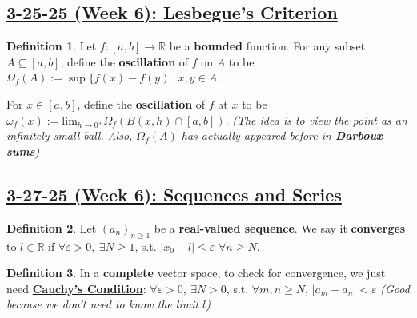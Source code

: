\documentclass[12pt,a4paper]{article}
\theoremstyle{definition}
\newtheorem{defin}{Definition}[subsection]
\newenvironment{definition}{
  \begin{defin}
}{
  \end{defin}
  \vspace{0.125em}
}
\begin{document}
\setcounter{defin}{0}
\setcounter{ex}{0}
\subsection*{\underline{\textbf{3-25-25 (Week 6): Lesbegue's Criterion}}}
\begin{definition}
  Let $f: [a, b] \to \mathbb{R}$ be a \textbf{bounded} function. For any subset $A \subseteq [a, b]$, define the \textbf{oscillation} of $f$ on $A$ to be $\boxed{\Omega_f(A) := \sup\{f(x) - f(y)\ |\ x, y \in A}$. \newline
  
  \noindent For $x \in [a, b]$, define the \textbf{oscillation} of $f$ at $x$ to be $\boxed{\omega_f(x) := \text{lim}_{h \to 0^+} \Omega_f(B(x, h) \cap [a, b])}$. \textit{(The idea is to view the point as an infinitely small ball. Also, $\Omega_f(A)$ has actually appeared before in \textbf{Darboux sums})}
\end{definition}

\setcounter{defin}{0}
\setcounter{ex}{0}
\subsection*{\underline{\textbf{3-27-25 (Week 6): Sequences and Series}}}
\begin{definition}
  Let $(a_n)_{n \geq 1}$ be a \textbf{real-valued sequence}. We say it \textbf{converges} to $l \in \mathbb{R}$ if $\forall \varepsilon > 0,\ \exists N \geq 1$, s.t. \underline{$|x_0 - l| \leq \varepsilon$} $\forall n \geq N$.
\end{definition}

\begin{definition}
  In a \textbf{complete} vector space, to check for convergence, we just need \textbf{\underline{Cauchy's Condition}}: $\forall \varepsilon > 0,\ \exists N > 0$, s.t. $\forall m, n \geq N$, \underline{$|a_m - a_n| < \varepsilon$} \textit{(Good because we don't need to know the limit $l$)}
\end{definition}
\end{document}
